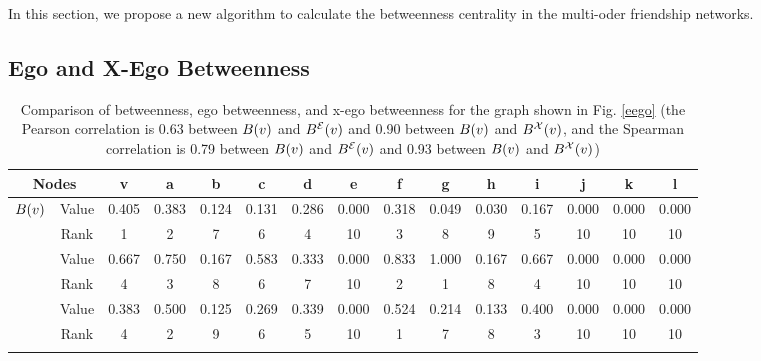 In this section, we propose a new algorithm to calculate the betweenness centrality in the multi-oder friendship
networks.
\subsection{Ego and X-Ego Betweenness}\label{betweenness-sub}
\begin{center}
\begin{table*}[t]
 \caption{Comparison of betweenness, ego betweenness, and x-ego betweenness for the graph shown in Fig. \ref{eego} (the Pearson correlation is 0.63 between $B({v})$ and $\BE{v}$ and 0.90 between $B({v})$ and $\BX{v}$, and the Spearman correlation is 0.79 between $B({v})$ and $\BE{v}$ and 0.93 between $B({v})$ and $\BX{v}$)}\label{comparison}
 \resizebox{17.4cm}{!} {
 \begin{tabular}{|c|c|c|c|c|c|c|c|c|c|c|c|c|c|c|}
 \hline
\multicolumn{2}{|c|}{Nodes} & v & a & b & c & d & e & f & g & h & i & j & k & l \\
 \hline
\multirow{2}{*}{$B({v})$} & Value & 0.405 & 0.383 & 0.124 & 0.131 & 0.286 & 0.000 & 0.318 & 0.049 & 0.030 & 0.167 & 0.000 & 0.000 & 0.000\\
\hhline{~--------------}
& Rank & 1 & 2 & 7 & 6 & 4 & 10 & 3 & 8 & 9 & 5 & 10 & 10 & 10\\
\hhline{---------------}
\multirow{2}{*}{$\BE{v}$} & Value & 0.667 & 0.750 & 0.167 & 0.583 & 0.333 & 0.000 & 0.833 & 1.000 & 0.167 & 0.667 & 0.000 & 0.000 & 0.000\\
\hhline{~--------------}
& Rank & 4 & 3 & 8 & 6 & 7 & 10 & 2 & 1 & 8 & 4 & 10 & 10 & 10\\
\hhline{---------------}
\multirow{2}{*}{$\BX{v}$} & Value & 0.383 & 0.500 & 0.125 & 0.269 & 0.339 & 0.000 & 0.524 & 0.214 & 0.133 & 0.400 & 0.000 & 0.000 & 0.000\\
\hhline{~--------------}
& Rank & 4 & 2 & 9 & 6 & 5 & 10 & 1 & 7 & 8 & 3 & 10 & 10 & 10\\
\hhline{---------------}
 \hline
 \end{tabular}
}
\end{table*}
\end{center}

